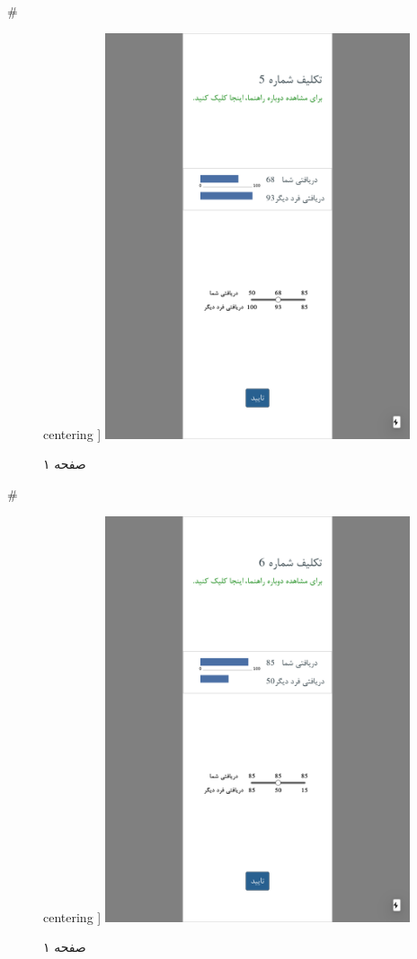 { 
 # 
\begin{figure}[htpb]
centering ]
\includegraphics[width=0.8\textwidth]{./img/Task46.png/}
\caption{صفحه ۱}
\label{fig:Task1}
\end{figure}
 
 
 # 
\begin{figure}[htpb]
centering ]
\includegraphics[width=0.8\textwidth]{./img/Task47.png/}
\caption{صفحه ۱}
\label{fig:Task1}
\end{figure}
 
}
